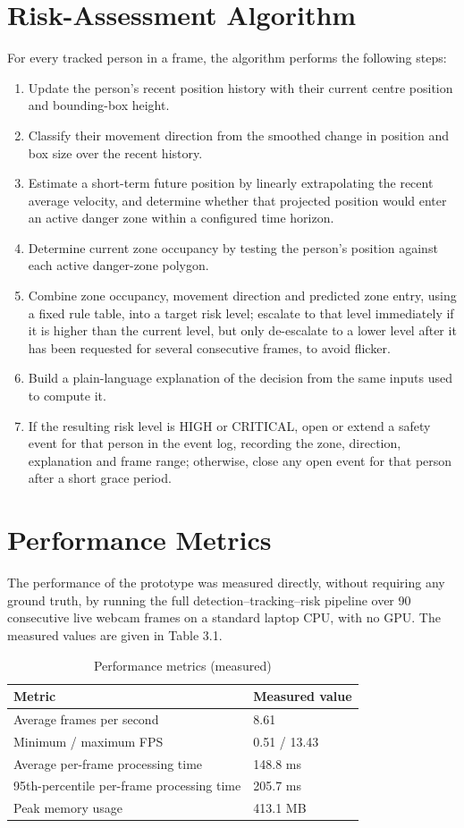 \documentclass[12pt,a4paper]{report}
\begin{document}
\section{Risk-Assessment Algorithm}
For every tracked person in a frame, the algorithm performs the following steps:
\begin{enumerate}[leftmargin=*,itemsep=2pt]
\item Update the person's recent position history with their current centre position and bounding-box height.
\item Classify their movement direction from the smoothed change in position and box size over the recent history.
\item Estimate a short-term future position by linearly extrapolating the recent average velocity, and determine whether that projected position would enter an active danger zone within a configured time horizon.
\item Determine current zone occupancy by testing the person's position against each active danger-zone polygon.
\item Combine zone occupancy, movement direction and predicted zone entry, using a fixed rule table, into a target risk level; escalate to that level immediately if it is higher than the current level, but only de-escalate to a lower level after it has been requested for several consecutive frames, to avoid flicker.
\item Build a plain-language explanation of the decision from the same inputs used to compute it.
\item If the resulting risk level is HIGH or CRITICAL, open or extend a safety event for that person in the event log, recording the zone, direction, explanation and frame range; otherwise, close any open event for that person after a short grace period.
\end{enumerate}

\section{Performance Metrics}
The performance of the prototype was measured directly, without requiring any ground truth, by running the full detection--tracking--risk pipeline over 90 consecutive live webcam frames on a standard laptop CPU, with no GPU. The measured values are given in Table 3.1.

\begin{table}[H]
\centering
\begin{tabular}{|p{3.4in}|p{2.0in}|}
\hline
\textbf{Metric} & \textbf{Measured value} \\ \hline
Average frames per second & 8.61 \\ \hline
Minimum / maximum FPS & 0.51 / 13.43 \\ \hline
Average per-frame processing time & 148.8 ms \\ \hline
95th-percentile per-frame processing time & 205.7 ms \\ \hline
Peak memory usage & 413.1 MB \\ \hline
\end{tabular}
\caption{Performance metrics (measured)}
\label{tab:3.1}
\end{table}
\end{document}

